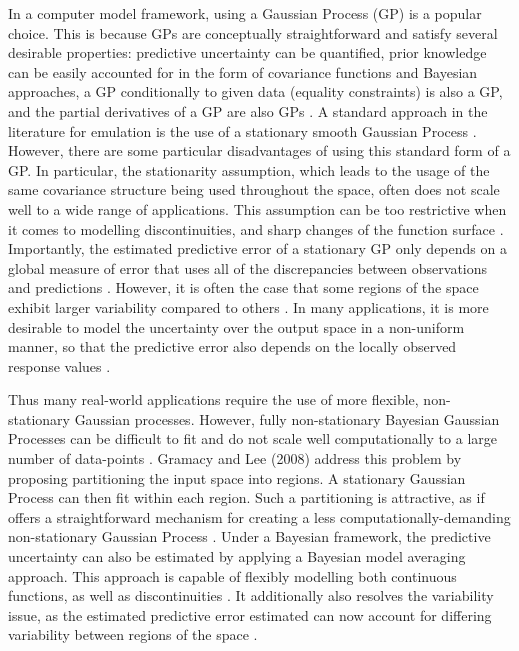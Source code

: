 \documentclass{article}\usepackage[]{graphicx}\usepackage[]{color}
\begin{document}
In a computer model framework, using a Gaussian Process (GP) is a popular choice. This is because GPs are conceptually straightforward and satisfy several desirable properties: predictive uncertainty can be quantified, prior knowledge can be easily accounted for in the form of covariance functions and Bayesian approaches, a GP conditionally to given data (equality constraints) is also a GP, and the partial derivatives of a GP are also GPs \cite{maatouk_bay_2017, gramacy_lee_2008}. A standard approach in the literature for emulation is the use of a stationary smooth Gaussian Process \cite{gramacy_lee_2008}. However, there are some particular disadvantages of using this standard form of a GP. In particular, the stationarity assumption, which leads to the usage of the same covariance structure being used throughout the space, often does not scale well to a wide range of applications. This assumption can be too restrictive when it comes to modelling discontinuities, and sharp changes of the function surface \cite{gramacy_lee_2008}. Importantly, the estimated predictive error of a stationary GP only depends on a global measure of error that uses all of the discrepancies between observations and predictions \cite{gramacy_lee_2008}. However, it is often the case that some regions of the space exhibit larger variability compared to others \cite{gramacy_lee_2008}. In many applications, it is more desirable to model the uncertainty over the output space in a non-uniform manner, so that the predictive error also depends on the locally observed response values \cite{gramacy_lee_2008}. 

\vspace{1em}

Thus many real-world applications require the use of more flexible, non-stationary Gaussian processes. However, fully non-stationary Bayesian Gaussian Processes can be difficult to fit and do not scale well computationally to a large number of data-points \cite{gramacy_lee_2008}. Gramacy and Lee (2008) address this problem by proposing partitioning the input space into regions. A stationary Gaussian Process can then fit within each region. Such a partitioning is attractive, as if offers a straightforward mechanism for creating a less computationally-demanding non-stationary Gaussian Process \cite{gramacy_lee_2008}. Under a Bayesian framework, the predictive uncertainty can also be estimated by applying a Bayesian model averaging approach. This approach is capable of flexibly modelling both continuous functions, as well as discontinuities \cite{gramacy_lee_2008}. It additionally also resolves the variability issue, as the estimated predictive error estimated can now account for differing variability between regions of the space \cite{gramacy_lee_2008}. 
\end{document}
